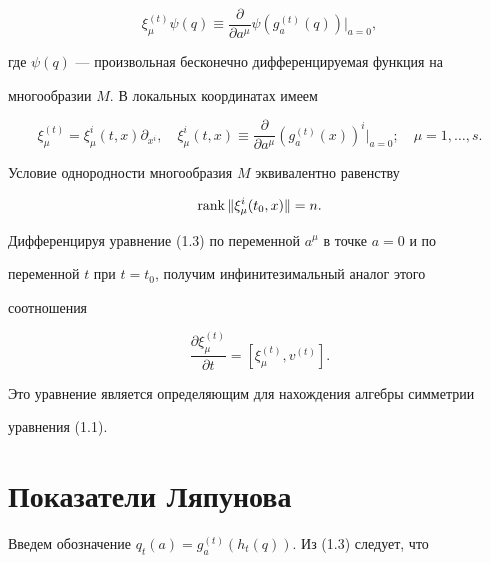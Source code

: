 $$ 


\xi^{(t)}_\mu\psi(q)\equiv 


\frac{\partial}{\partial a^\mu}\psi(g^{(t)}_a(q))|_{a=0}, 


$$ 


где $\psi(q)$ --- произвольная бесконечно дифференцируемая функция на 


многообразии $M$. В локальных координатах имеем 


$$ 


\xi^{(t)}_\mu=\xi^i_\mu(t,x)\partial_{x^i},\quad 


\xi^i_\mu(t,x)\equiv\frac{\partial}{\partial a^\mu} 


(g^{(t)}_a(x))^i|_{a=0};\quad \mu=1,\dotsc,s. 


$$ 


Условие однородности многообразия $M$ эквивалентно равенству 


\begin{equation} 


\rank\|\xi^i_\mu(t_0,x)\|=n. 


\end{equation} 


 


Дифференцируя уравнение (1.3) по переменной $a^\mu$ в точке $a=0$ и по 


переменной $t$ при $t=t_0$, получим инфинитезимальный аналог этого 


соотношения 


\begin{equation} 


\frac{\partial\xi^{(t)}_\mu}{\partial t}= 


[\xi^{(t)}_\mu,v^{(t)}]. 


\end{equation} 


Это уравнение является определяющим для нахождения алгебры симметрии 


уравнения (1.1). 


 


\section{Показатели Ляпунова} 


 


Введем обозначение $q_t(a)=g^{(t)}_a(h_t(q))$. Из (1.3) следует, что 


